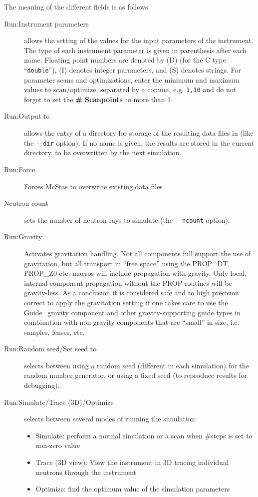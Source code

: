 The meaning of the different fields is as follows:
\begin{description}
\item[Run:Instrument parameters] allows the setting of the values for the input
  parameters of the instrument. The type of each instrument parameter is given
  in parenthesis after each name. Floating point numbers are denoted by (D) (for
  the C type ``\verb+double+''), (I) denotes integer parameters, and (S) denotes
  strings. For parameter scans and optimizations, enter the minimum and maximum
  values to scan/optimize, separated by a comma, e.g. \verb+1,10+ and do not
  forget to set the \textbf{\# Scanpoints} to more than 1.
\item[Run:Output to] allows the entry of a directory for storage of the
  resulting data files in (like the \verb+--dir+ option). If no name is given,
  the results are stored in the current directory, to be overwritten by the next
  simulation.
\item[Run:Force] Forces McStas to overwrite existing data files
\item[Neutron count] sets the number of neutron rays to
  simulate (the \verb+--ncount+ option).
\item[Run:Gravity] Activates gravitation handling. Not all components full
  support the use of gravitation, but all transport in ``free space'' using the
  PROP\_DT, PROP\_Z0 etc. macros will include propagation with gravity. Only
  local, internal component propagation without the PROP routines will be
  gravity-less. As a conclusion it is considered safe and to high precision
  correct to apply the gravitation setting if one takes care to use the
  Guide\_gravity component and other gravity-supporting guide types in
  combination with non-gravity components that are ``small'' in size,
  i.e. samples, lenses, etc.
\item[Run:Random seed/Set seed to] selects between using a random seed (different
  in each simulation) for the random number generator, or using a fixed
  seed (to reproduce results for debugging).
\item[Run:Simulate/Trace (3D)/Optimize] selects between several modes of
  running the simulation:
  \begin{itemize}
  \item Simulate: perform a normal simulation or a scan when \#steps
    is set to non-zero value
  \item Trace (3D view): View the instrument in 3D tracing individual
    neutrons through the instrument
  \item Optimize: find the optimum value of the simulation parameters

\end{itemize}
\end{description}
